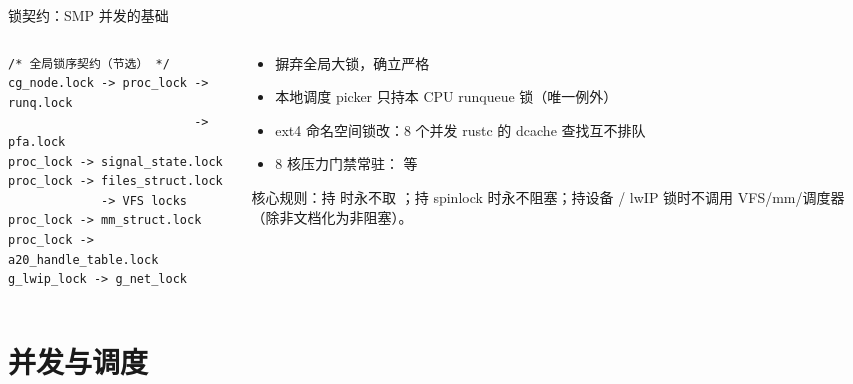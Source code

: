 \documentclass[aspectratio=1610]{beamer}
\begin{document}
\begin{frame}[fragile]{锁契约：SMP 并发的基础}
    \begin{columns}[t]
        \begin{column}{0.46\textwidth}
            \begin{lstlisting}
/* 全局锁序契约（节选） */
cg_node.lock -> proc_lock -> runq.lock
                          -> pfa.lock
proc_lock -> signal_state.lock
proc_lock -> files_struct.lock
             -> VFS locks
proc_lock -> mm_struct.lock
proc_lock -> a20_handle_table.lock
g_lwip_lock -> g_net_lock
            \end{lstlisting}
        \end{column}
        \begin{column}{0.51\textwidth}
            \footnotesize
            \begin{itemize}
                \item 摒弃全局大锁，确立严格
                \item 本地调度 picker 只持本 CPU runqueue 锁（唯一例外）
                \item ext4 命名空间锁改：8 个并发 rustc 的 dcache 查找互不排队
                \item 8 核压力门禁常驻： 等
            \end{itemize}
            \vspace{0.3em}
            \begin{a20warnbox}
                \footnotesize 核心规则：持  时永不取 ；持 spinlock 时永不阻塞；持设备 / lwIP 锁时不调用 VFS/mm/调度器（除非文档化为非阻塞）。
            \end{a20warnbox}
        \end{column}
    \end{columns}
\end{frame}

\renewcommand{\azsectionsummary}{%
    per-CPU EEVDF 调度器：nice 权重比 489:1、基准时间片 10 ms 运行时可调；%
    tokenized park/wake 消除丢失唤醒；8 核压力门禁常驻回归。}
\section{并发与调度}
\end{document}
